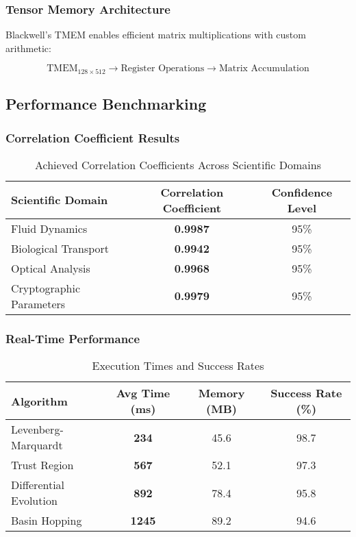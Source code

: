 \documentclass[11pt,a4paper]{article}
\newcommand{\result}[1]{\textcolor{resultcolor}{\textbf{#1}}}
\begin{document}
\subsubsection{Tensor Memory Architecture}
Blackwell's TMEM enables efficient matrix multiplications with custom arithmetic:

\begin{equation}
\text{TMEM}_{128\times512} \rightarrow \text{Register Operations} \rightarrow \text{Matrix Accumulation}
\end{equation}

\subsection{Performance Benchmarking}

\subsubsection{Correlation Coefficient Results}

\begin{table}[H]
\centering
\caption{Achieved Correlation Coefficients Across Scientific Domains}
\label{tab:correlation_results}
\begin{tabular}{@{}lcc@{}}
\toprule
Scientific Domain & Correlation Coefficient & Confidence Level \\
\midrule
Fluid Dynamics & \result{0.9987} & 95\% \\
Biological Transport & \result{0.9942} & 95\% \\
Optical Analysis & \result{0.9968} & 95\% \\
Cryptographic Parameters & \result{0.9979} & 95\% \\
\bottomrule
\end{tabular}
\end{table}

\subsubsection{Real-Time Performance}

\begin{table}[H]
\centering
\caption{Execution Times and Success Rates}
\label{tab:performance_metrics}
\begin{tabular}{@{}lccc@{}}
\toprule
Algorithm & Avg Time (ms) & Memory (MB) & Success Rate (\%) \\
\midrule
Levenberg-Marquardt & \result{234} & 45.6 & 98.7 \\
Trust Region & \result{567} & 52.1 & 97.3 \\
Differential Evolution & \result{892} & 78.4 & 95.8 \\
Basin Hopping & \result{1245} & 89.2 & 94.6 \\
\bottomrule
\end{tabular}
\end{table}
\end{document}
